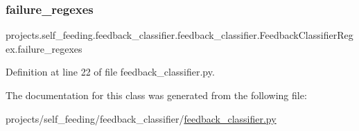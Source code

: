 \subsubsection{\texorpdfstring{failure\+\_\+regexes}{failure\_regexes}}
{\footnotesize\ttfamily projects.\+self\+\_\+feeding.\+feedback\+\_\+classifier.\+feedback\+\_\+classifier.\+Feedback\+Classifier\+Regex.\+failure\+\_\+regexes}



Definition at line 22 of file feedback\+\_\+classifier.\+py.



The documentation for this class was generated from the following file\+:\begin{DoxyCompactItemize}
\item 
projects/self\+\_\+feeding/feedback\+\_\+classifier/\hyperlink{feedback__classifier_8py}{feedback\+\_\+classifier.\+py}\end{DoxyCompactItemize}
